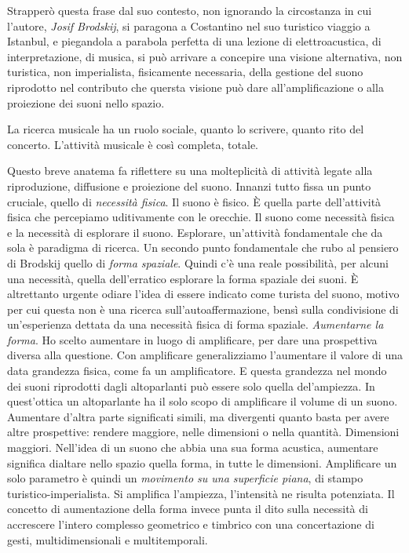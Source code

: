 \documentclass[a4paper,11pt]{article}
\begin{document}
Strapperò questa frase dal suo contesto, non ignorando la circostanza in
cui l'autore, \emph{Josif Brodskij}, si paragona a Costantino nel suo
turistico viaggio a Istanbul, e piegandola a parabola perfetta di una
lezione di elettroacustica, di interpretazione, di musica, si può
arrivare a concepire una visione alternativa, non turistica, non
imperialista, fisicamente necessaria, della gestione del suono
riprodotto nel contributo che quersta visione può dare
all'amplificazione o alla proiezione dei suoni nello spazio.

La ricerca musicale ha un ruolo sociale, quanto lo scrivere, quanto rito
del concerto. L'attività musicale è così completa, totale.

Questo breve anatema fa riflettere su una molteplicità di attività
legate alla riproduzione, diffusione e proiezione del suono. Innanzi
tutto fissa un punto cruciale, quello di \emph{necessità fisica}. Il suono è
fisico. È quella parte dell'attività fisica che percepiamo uditivamente
con le orecchie. Il suono come necessità fisica e la necessità di
esplorare il suono. Esplorare, un'attività fondamentale che da sola è
paradigma di ricerca. Un secondo punto fondamentale che rubo al pensiero
di Brodskij quello di \emph{forma spaziale}. Quindi c'è una reale
possibilità, per alcuni una necessità, quella dell'erratico esplorare la
forma spaziale dei suoni. È altrettanto urgente odiare l'idea di essere
indicato come turista del suono, motivo per cui questa non è una ricerca
sull'autoaffermazione, bensì sulla condivisione di un'esperienza dettata
da una necessità fisica di forma spaziale. \emph{Aumentarne la forma}. Ho
scelto aumentare in luogo di amplificare, per dare una prospettiva
diversa alla questione. Con amplificare generalizziamo l'aumentare il
valore di una data grandezza fisica, come fa un amplificatore. E questa
grandezza nel mondo dei suoni riprodotti dagli altoparlanti può essere
solo quella del'ampiezza. In quest'ottica un altoparlante ha il solo
scopo di amplificare il volume di un suono. Aumentare d'altra parte
significati simili, ma divergenti quanto basta per avere altre
prospettive: rendere maggiore, nelle dimensioni o nella quantità.
Dimensioni maggiori. Nell'idea di un suono che abbia una sua forma
acustica, aumentare significa dialtare nello spazio quella forma, in
tutte le dimensioni. Amplificare un solo parametro è quindi un
\emph{movimento su una superficie piana}, di stampo turistico-imperialista.
Si amplifica l'ampiezza, l'intensità ne risulta potenziata. Il concetto
di aumentazione della forma invece punta il dito sulla necessità di
accrescere l'intero complesso geometrico e timbrico con una
concertazione di gesti, multidimensionali e multitemporali.
\end{document}
